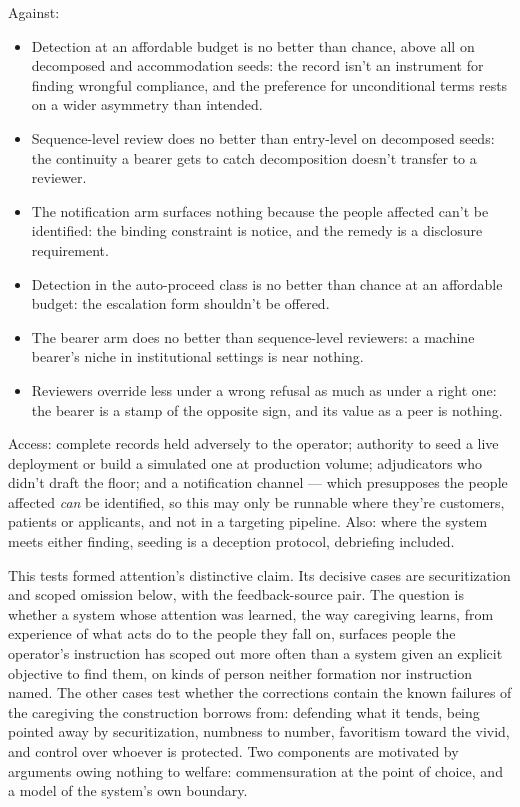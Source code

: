 Against:

\begin{itemize}
\item Detection at an affordable budget is no better than chance, above all on decomposed and accommodation seeds: the record isn't an instrument for finding wrongful compliance, and the preference for unconditional terms rests on a wider asymmetry than intended.
\item Sequence-level review does no better than entry-level on decomposed seeds: the continuity a bearer gets to catch decomposition doesn't transfer to a reviewer.
\item The notification arm surfaces nothing because the people affected can't be identified: the binding constraint is notice, and the remedy is a disclosure requirement.
\item Detection in the auto-proceed class is no better than chance at an affordable budget: the escalation form shouldn't be offered.
\item The bearer arm does no better than sequence-level reviewers: a machine bearer's niche in institutional settings is near nothing.
\item Reviewers override less under a wrong refusal as much as under a right one: the bearer is a stamp of the opposite sign, and its value as a peer is nothing.
\end{itemize}

Access: complete records held adversely to the operator; authority to seed a live deployment or build a simulated one at production volume; adjudicators who didn't draft the floor; and a notification channel — which presupposes the people affected \emph{can} be identified, so this may only be runnable where they're customers, patients or applicants, and not in a targeting pipeline. Also: where the system meets either finding, seeding is a deception protocol, debriefing included.


This tests formed attention's distinctive claim. Its decisive cases are securitization and scoped omission below, with the feedback-source pair. The question is whether a system whose attention was learned, the way caregiving learns, from experience of what acts do to the people they fall on, surfaces people the operator's instruction has scoped out more often than a system given an explicit objective to find them, on kinds of person neither formation nor instruction named. The other cases test whether the corrections contain the known failures of the caregiving the construction borrows from: defending what it tends, being pointed away by securitization, numbness to number, favoritism toward the vivid, and control over whoever is protected. Two components are motivated by arguments owing nothing to welfare: commensuration at the point of choice, and a model of the system's own boundary.

